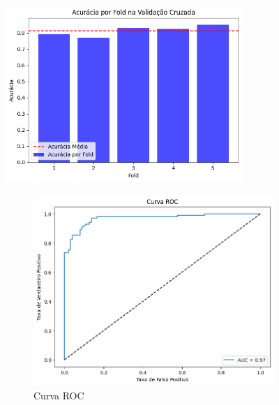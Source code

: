 \begin{figure}[htb]
	\centering
	\caption{Resultados da validação do modelo de classificação de personas.}
	\label{fig:persona_results}
	\includegraphics[width=0.8\textwidth]{images/persona_stratified_kfold.png}
	\vspace{1cm} %
	\begin{subfigure}[b]{0.49\textwidth}
		\includegraphics[width=\textwidth]{images/persona_roc.png}
		\caption{Curva ROC}
		\label{fig:persona_roc}
	\end{subfigure}
	~ %
	\begin{subfigure}[b]{0.49\textwidth}

\end{subfigure}
\end{figure}
